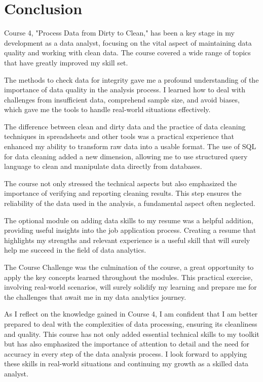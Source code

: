 \documentclass[]{article}
\begin{document}
\pagebreak

\section{Conclusion}

Course 4, "Process Data from Dirty to Clean," has been a key stage in my development as a data analyst, focusing on the vital aspect of maintaining data quality and working with clean data. The course covered a wide range of topics that have greatly improved my skill set.

The methods to check data for integrity gave me a profound understanding of the importance of data quality in the analysis process. I learned how to deal with challenges from insufficient data, comprehend sample size, and avoid biases, which gave me the tools to handle real-world situations effectively.

The difference between clean and dirty data and the practice of data cleaning techniques in spreadsheets and other tools was a practical experience that enhanced my ability to transform raw data into a usable format. The use of SQL for data cleaning added a new dimension, allowing me to use structured query language to clean and manipulate data directly from databases.

The course not only stressed the technical aspects but also emphasized the importance of verifying and reporting cleaning results. This step ensures the reliability of the data used in the analysis, a fundamental aspect often neglected.

The optional module on adding data skills to my resume was a helpful addition, providing useful insights into the job application process. Creating a resume that highlights my strengths and relevant experience is a useful skill that will surely help me succeed in the field of data analytics.

The Course Challenge was the culmination of the course, a great opportunity to apply the key concepts learned throughout the modules. This practical exercise, involving real-world scenarios, will surely solidify my learning and prepare me for the challenges that await me in my data analytics journey.

As I reflect on the knowledge gained in Course 4, I am confident that I am better prepared to deal with the complexities of data processing, ensuring its cleanliness and quality. This course has not only added essential technical skills to my toolkit but has also emphasized the importance of attention to detail and the need for accuracy in every step of the data analysis process. I look forward to applying these skills in real-world situations and continuing my growth as a skilled data analyst.
\end{document}
